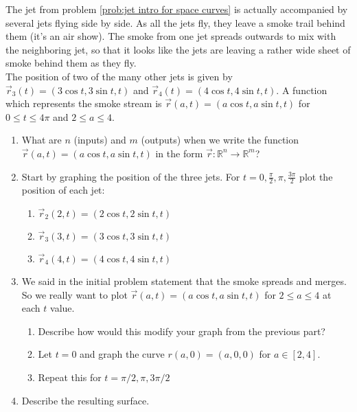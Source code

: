 \begin{problem} \label{prob:parametric surface example}%
%
 The jet from problem \ref{prob:jet intro for space curves} is actually accompanied by several jets flying side by side. As all the jets fly, they leave a smoke trail behind them (it's an air show). The smoke from one jet spreads outwards to mix with the neighboring jet, so that it looks like the jets are leaving a rather wide sheet of smoke behind them as they fly. \\
The position of two of the many other jets is given by $\vec r_3(t)=(3\cos t, 3\sin t, t)$ and $\vec r_4(t)=(4\cos t,4\sin t,t)$.  A function which represents the smoke stream is $\vec r(a,t)=(a\cos t, a\sin t, t)$ for $0\leq t\leq 4\pi$ and $2\leq a\leq 4$.
 \begin{enumerate}
  \item What are $n$ (inputs) and $m$ (outputs) when we write the function $\vec r(a,t)=(a\cos t, a\sin t, t)$ in the form  $\vec r\colon {\mathbb{R}}^n\to {\mathbb{R}}^m$?
  \item Start by graphing the position of the three jets. For $t=0, \frac{\pi}{2}, \pi, \frac{3\pi}{2}$ plot the position of each jet:
	\begin{enumerate}
		\item $\vec r_2(2,t)=(2\cos t, 2\sin t, t)$
		\item $\vec r_3(3,t)=(3\cos t, 3\sin t, t)$
		\item $\vec r_4(4,t)=(4\cos t, 4\sin t, t)$
	\end{enumerate}
	\item We said in the initial problem statement that the smoke spreads and merges. So we really want to plot $\vec{r}(a,t)=(a\cos t, a\sin t, t)$ for $2\leq a \leq 4$ at each $t$ value. 
	\begin{enumerate}
		\item Describe how would this modify your graph from the previous part?
		\item Let $t=0$ and graph the curve $r(a,0)=(a,0,0)$ for $a\in[2,4]$.
		\item Repeat this for $t=\pi/2,\pi,3\pi/2$
	\end{enumerate}
  \item Describe the resulting surface.
 \end{enumerate}
\end{problem}

